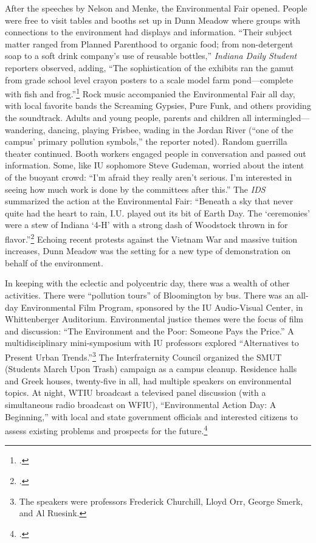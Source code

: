 \documentclass[
  american,
  letterpaper,
]{scrreprt}
\begin{document}
After the speeches by Nelson and Menke, the Environmental Fair opened.
People were free to visit tables and booths set up in Dunn Meadow where
groups with connections to the environment had displays and information.
``Their subject matter ranged from Planned Parenthood to organic food;
from non-detergent soap to a soft drink company's use of reusable
bottles,'' \emph{Indiana Daily Student} reporters observed, adding,
``The sophistication of the exhibits ran the gamut from grade school
level crayon posters to a scale model farm pond---complete with fish and
frog.''\footnote{.} Rock music accompanied
the Environmental Fair all day, with local favorite bands the Screaming
Gypsies, Pure Funk, and others providing the soundtrack. Adults and
young people, parents and children all intermingled---wandering,
dancing, playing Frisbee, wading in the Jordan River (``one of the
campus' primary pollution symbols,'' the reporter noted). Random
guerrilla theater continued. Booth workers engaged people in
conversation and passed out information. Some, like IU sophomore Steve
Gudeman, worried about the intent of the buoyant crowd: ``I'm afraid
they really aren't serious. I'm interested in seeing how much work is
done by the committees after this.'' The \emph{IDS} summarized the
action at the Environmental Fair: ``Beneath a sky that never quite had
the heart to rain, I.U. played out its bit of Earth Day. The
`ceremonies' were a stew of Indiana `4-H' with a strong dash of
Woodstock thrown in for flavor.''\footnote{.} Echoing recent protests against the Vietnam War and
massive tuition increases, Dunn Meadow was the setting for a new type of
demonstration on behalf of the environment.

In keeping with the eclectic and polycentric day, there was a wealth of
other activities. There were ``pollution tours'' of Bloomington by bus.
There was an all-day Environmental Film Program, sponsored by the IU
Audio-Visual Center, in Whittenberger Auditorium. Environmental justice
themes were the focus of film and discussion: ``The Environment and the
Poor: Someone Pays the Price.'' A multidisciplinary mini-symposium with
IU professors explored ``Alternatives to Present Urban
Trends.''\footnote{The speakers were professors Frederick Churchill,
  Lloyd Orr, George Smerk, and Al Ruesink.} The Interfraternity Council
organized the SMUT (Students March Upon Trash) campaign as a campus
cleanup. Residence halls and Greek houses, twenty-five in all, had
multiple speakers on environmental topics. At night, WTIU broadcast a
televised panel discussion (with a simultaneous radio broadcast on
WFIU), ``Environmental Action Day: A Beginning,'' with local and state
government officials and interested citizens to assess existing problems
and prospects for the future.\footnote{.}
\end{document}
